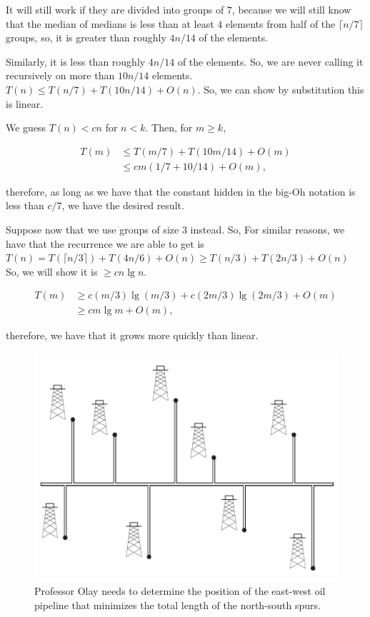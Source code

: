 \documentclass{article}
\begin{document}
It will still work if they are divided into groups of $7$, because we will still know that the median of medians is less than at least $4$ elements from half of the $\lceil n / 7 \rceil$ groups, so, it is greater than roughly $4n / 14$ of the elements.

Similarly, it is less than roughly $4n / 14$ of the elements. So, we are never calling it recursively on more than $10n / 14$ elements. $T(n) \le T(n / 7) + T(10n / 14) + O(n)$. So, we can show by substitution this is linear.

We guess $T(n) < cn$ for $n < k$. Then, for $m \ge k$,

$$
\begin{aligned}
T(m) & \le T(m / 7) + T(10m / 14) + O(m) \\
     & \le cm(1 / 7 + 10 / 14) + O(m),
\end{aligned}
$$

therefore, as long as we have that the constant hidden in the big-Oh notation is less than $c / 7$, we have the desired result.

Suppose now that we use groups of size $3$ instead. So, For similar reasons, we have that the recurrence we are able to get is $T(n) = T(\lceil n / 3 \rceil) + T(4n / 6) + O(n) \ge T(n / 3) + T(2n / 3) + O(n)$ So, we will show it is $\ge cn \lg n$.

$$
\begin{aligned}
T(m) & \ge c(m / 3)\lg (m / 3) + c(2m / 3) \lg (2m / 3) + O(m) \\
     & \ge cm\lg m + O(m),
\end{aligned}
$$

therefore, we have that it grows more quickly than linear.


\begin{figure}[h!]
  \includegraphics{oilcompany.png}
  \caption{Professor Olay needs to determine the position of the east-west oil pipeline that minimizes the total length of the north-south spurs.}
  \label{fig:oilcompany}
\end{figure}
\end{document}

